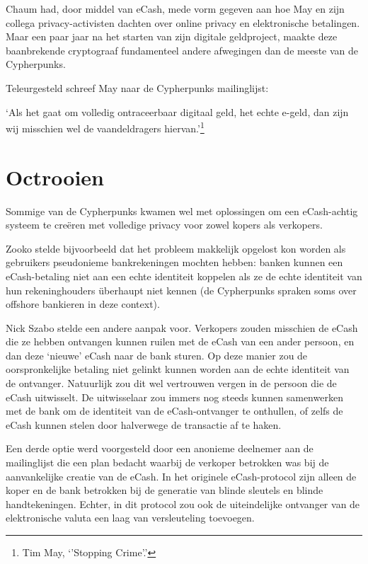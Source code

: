 \documentclass[smalldemyvopaper,11pt,twoside,onecolumn,openright,extrafontsizes,hidelinks]{memoir}
\begin{document}
Chaum had, door middel van eCash, mede vorm gegeven aan hoe May en zijn
collega privacy-activisten dachten over online privacy en elektronische
betalingen. Maar een paar jaar na het starten van zijn digitale
geldproject, maakte deze baanbrekende cryptograaf fundamenteel andere
afwegingen dan de meeste van de Cypherpunks.

Teleurgesteld schreef May naar de Cypherpunks mailinglijst:

`Als het gaat om volledig ontraceerbaar digitaal geld, het echte e-geld,
dan zijn wij misschien wel de vaandeldragers hiervan.'\footnote{Tim May,
  `'Stopping Crime'.'}

\section{Octrooien}\label{octrooien}

Sommige van de Cypherpunks kwamen wel met oplossingen om een
eCash-achtig systeem te creëren met volledige privacy voor zowel kopers
als verkopers.

Zooko stelde bijvoorbeeld dat het probleem makkelijk opgelost kon worden
als gebruikers pseudonieme bankrekeningen mochten hebben: banken kunnen
een eCash-betaling niet aan een echte identiteit koppelen als ze de
echte identiteit van hun rekeninghouders überhaupt niet kennen (de
Cypherpunks spraken soms over offshore bankieren in deze context).

Nick Szabo stelde een andere aanpak voor. Verkopers zouden misschien de
eCash die ze hebben ontvangen kunnen ruilen met de eCash van een ander
persoon, en dan deze `nieuwe' eCash naar de bank sturen. Op deze manier
zou de oorspronkelijke betaling niet gelinkt kunnen worden aan de echte
identiteit van de ontvanger. Natuurlijk zou dit wel vertrouwen vergen in
de persoon die de eCash uitwisselt. De uitwisselaar zou immers nog
steeds kunnen samenwerken met de bank om de identiteit van de
eCash-ontvanger te onthullen, of zelfs de eCash kunnen stelen door
halverwege de transactie af te haken.

Een derde optie werd voorgesteld door een anonieme deelnemer aan de
mailinglijst die een plan bedacht waarbij de verkoper betrokken was bij
de aanvankelijke creatie van de eCash. In het originele eCash-protocol
zijn alleen de koper en de bank betrokken bij de generatie van blinde
sleutels en blinde handtekeningen. Echter, in dit protocol zou ook de
uiteindelijke ontvanger van de elektronische valuta een laag van
versleuteling toevoegen.
\end{document}
